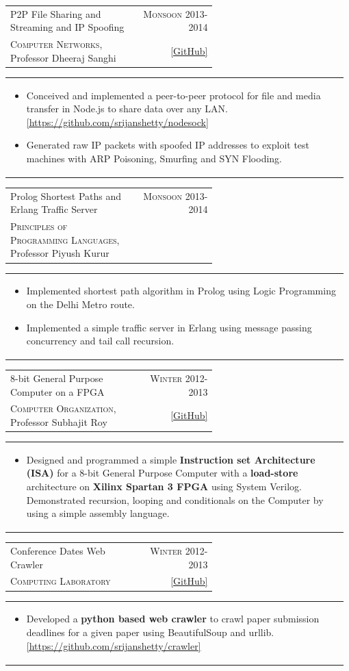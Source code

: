 \documentclass[a4paper]{article} %
\newcommand{\verticalspacing}{-0.25cm}
\newcommand{\bulletspace}{0.7cm}
\newcommand{\cproject}[5]{
    \begin{tabular}{p{0.60\linewidth}r}
        \textcolor{NavyBlue}{\small #2} & \multicolumn{1}{m{7.3cm}}{\raggedleft \small {\textsc{#1}}}\\
        \small {#3} & \small {#4}
    \end{tabular}
    \begin{tabular}{p{0.98\linewidth}}
    \vspace{-0.3cm}
        \small{#5}
    \end{tabular}
    \vspace{\verticalspacing{}}
}
\begin{document}
\cproject
    {Monsoon 2013-2014}
    {P2P File Sharing and Streaming and IP Spoofing}
    {\textsc{Computer Networks}, Professor Dheeraj Sanghi}
    { \href{https://github.com/srijanshetty/nodesock} {[GitHub]} }
    {
        \begin{itemize}[leftmargin=\bulletspace{}]
            \item Conceived and implemented a peer-to-peer protocol for file and media transfer in Node.js to share
                data over any LAN.  \href{https://github.com/srijanshetty/nodesock} {[https://github.com/srijanshetty/nodesock]}
            \item Generated raw IP packets with spoofed IP addresses to exploit test machines with ARP Poisoning,
                Smurfing and SYN Flooding.
        \end{itemize}
    }

\cproject
    {Monsoon 2013-2014}
    {Prolog Shortest Paths and Erlang Traffic Server}
    {\textsc{Principles of Programming Languages}, Professor Piyush Kurur}
    {}
    {
        \begin{itemize}[leftmargin=\bulletspace{}]
            \item Implemented shortest path algorithm in Prolog using Logic Programming on the Delhi Metro route.
            \item Implemented a simple traffic server in Erlang using message passing concurrency and tail call recursion.
        \end{itemize}
    }


\cproject
    {Winter 2012-2013}
    {8-bit General Purpose Computer on a FPGA}
    {\textsc{Computer Organization}, Professor Subhajit Roy}
    { \href{https://github.com/srijanshetty/220\_y11} {[GitHub]} }
    {
        \begin{itemize}[leftmargin=\bulletspace{}]
            \item Designed and programmed a simple \textbf{Instruction set Architecture (ISA)} for a 8-bit General
                Purpose Computer with a \textbf{load-store}
                architecture on \textbf{Xilinx Spartan 3 FPGA} using System Verilog.  Demonstrated recursion, looping
                and conditionals on the Computer by using a simple assembly language.
        \end{itemize}
    }

\cproject
    {Winter 2012-2013}
    {Conference Dates Web Crawler}
    {\textsc{Computing Laboratory}}
    {\href{https://github.com/srijanshetty/crawler} { [GitHub] } }
    {
        \begin{itemize}[leftmargin=\bulletspace{}]
            \item Developed a \textbf{python based web crawler} to crawl paper submission deadlines for a given paper
                using BeautifulSoup and urllib.
                \href{https://github.com/srijanshetty/crawler} { [https://github.com/srijanshetty/crawler] }
        \end{itemize}
    }
\end{document}
